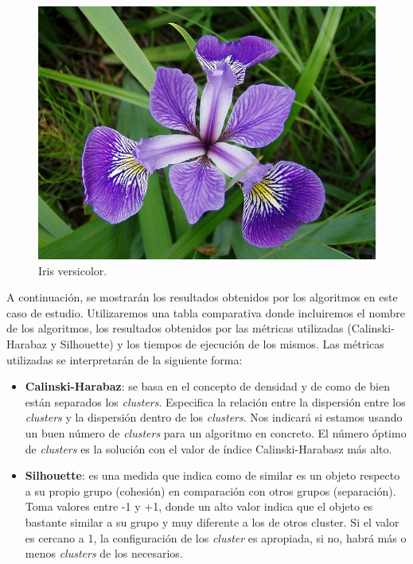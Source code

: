 \documentclass[a4paper, 20pt]{article}
\begin{document}
\begin{figure}[h]
  \begin{minipage}[h]{0.31\textwidth}
    \includegraphics[width=\textwidth]{dani/versicolor.jpg}
    \caption{Iris versicolor.}
  \end{minipage}
\end{figure}

A continuación, se mostrarán los resultados obtenidos por los algoritmos en este caso de estudio. Utilizaremos una tabla comparativa donde incluiremos el nombre de los algoritmos, los resultados obtenidos por las métricas utilizadas (Calinski-Harabaz y Silhouette) y los tiempos de ejecución de los mismos. Las métricas utilizadas se interpretarán de la siguiente forma:

\begin{itemize}
\item \textbf{Calinski-Harabaz}: se basa en el concepto de densidad y de como de bien están separados los \textit{clusters}. Especifica la relación entre la dispersión entre los \textit{clusters} y la dispersión dentro de los \textit{clusters}. Nos indicará si estamos usando un buen número de \textit{clusters} para un algoritmo en concreto. El número óptimo de \textit{clusters} es la solución con el valor de índice Calinski-Harabasz más alto.
\item \textbf{Silhouette}: es una medida que indica como de similar es un objeto respecto a su propio grupo (cohesión) en comparación con otros grupos (separación). Toma valores entre -1 y +1, donde un alto valor indica que el objeto es bastante similar a su grupo y muy diferente a los de otros cluster. Si el valor es cercano a 1, la configuración de los \textit{cluster} es apropiada, si no, habrá más o menos \textit{clusters} de los necesarios.
\end{itemize}
\end{document}
